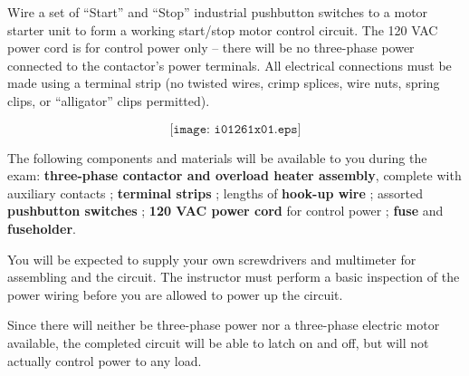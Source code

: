 

Wire a set of ``Start'' and ``Stop'' industrial pushbutton switches to a motor starter unit to form a working start/stop motor control circuit.  The 120 VAC power cord is for control power only -- there will be no three-phase power connected to the contactor's power terminals.  All electrical connections must be made using a terminal strip (no twisted wires, crimp splices, wire nuts, spring clips, or ``alligator'' clips permitted).

$$\texttt{[image: i01261x01.eps]}$$

The following components and materials will be available to you during the exam: {\bf three-phase contactor and overload heater assembly}, complete with auxiliary contacts ; {\bf terminal strips} ; lengths of {\bf hook-up wire} ; assorted {\bf pushbutton switches} ; {\bf 120 VAC power cord} for control power ; {\bf fuse} and {\bf fuseholder}.

\vskip 10pt

You will be expected to supply your own screwdrivers and multimeter for assembling and the circuit.  The instructor must perform a basic inspection of the power wiring before you are allowed to power up the circuit.

\vskip 10pt

Since there will neither be three-phase power nor a three-phase electric motor available, the completed circuit will be able to latch on and off, but will not actually control power to any load.

\vfil 

\eject






 










